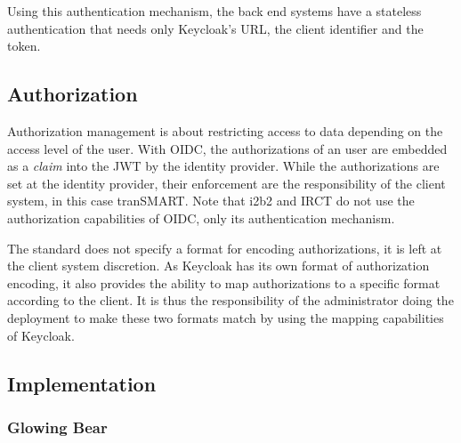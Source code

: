 Using this authentication mechanism, the back end systems have a stateless authentication that needs only Keycloak's URL, the client identifier and the token.



\subsection{Authorization}

Authorization management is about restricting access to data depending on the access level of the user.
With OIDC, the authorizations of an user are embedded as a \emph{claim} into the JWT by the identity provider.
While the authorizations are set at the identity provider, their enforcement are the responsibility of the client system, in this case tranSMART. 
Note that i2b2 and IRCT do not use the authorization capabilities of OIDC, only its authentication mechanism.

The standard does not specify a format for encoding authorizations, it is left at the client system discretion.
As Keycloak has its own format of authorization encoding, it also provides the ability to map authorizations to a specific format according to the client.
It is thus the responsibility of the administrator doing the deployment to make these two formats match by using the mapping capabilities of Keycloak.


\subsection{Implementation}


\subsubsection{Glowing Bear}

